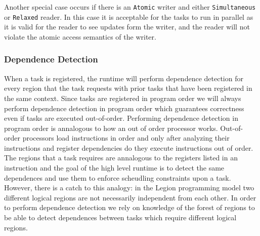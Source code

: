 Another special case occurs if there is an {\tt Atomic} writer and either {\tt Simultaneous}
or {\tt Relaxed} reader.  In this case it is acceptable for the tasks to run in
parallel as it is valid for the reader to see updates form the writer, and the
reader will not violate the atomic access semantics of the writer.



\subsubsection{Dependence Detection}
\label{subsec:depdetect}
When a task is registered, the runtime
will perform dependence detection for every region that the task requests with
prior tasks that have been registered in the same context.  Since
tasks are registered in program order we will always perform dependence detection
in program order which guarantees correctness even if tasks are executed out-of-order.  
Performing dependence detection in program order is annalogous to how an out of order
processor works.  Out-of-order processors load instructions in order and only after
analyzing their instructions and register dependencies do they execute instructions
out of order.  The regions that a task requires are annalogous
to the registers listed in an instruction and the goal of the high level
runtime is to detect the same dependences and use them to enforce scheudling constraints
upon a task.  However, there is a catch to this analogy: in the Legion programming
model two different logical regions are not necessarily independent from each other.  In
order to perform dependence detection we rely on knowledge of the forest of regions to be
able to detect dependences between tasks which require different logical regions.

